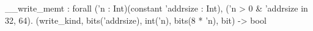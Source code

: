 __write_memt : forall ('n : Int)(constant 'addrsize : Int), ('n > 0 & 'addrsize in {32, 64}).
  (write_kind, bits('addrsize), int('n), bits(8 * 'n), bit) -> bool